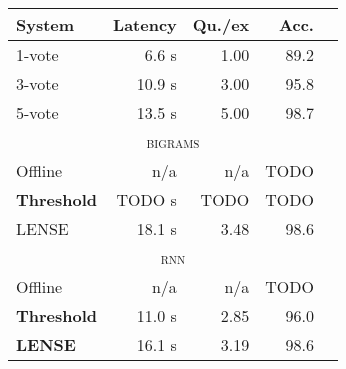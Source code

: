\begin{tabular}[b]{l  r  r  r  r}
    \textbf{System} & \textbf{Latency} & \textbf{Qu./ex} & \textbf{Acc.} \\ \hline
    1-vote & 6.6 s & 1.00 & 89.2 \\ %
    3-vote & 10.9 s & 3.00 & 95.8 \\ %
    5-vote & 13.5 s & 5.00 & 98.7 \\ %
    \multicolumn{5}{c}{\textsc{bigrams}} \\ \hline
    Offline & n/a & n/a & TODO \\ %
    \textbf{Threshold} & TODO s & TODO & TODO \\ %
    LENSE & 18.1 s & 3.48 & 98.6 \\ %
    \multicolumn{5}{c}{\textsc{rnn}} \\ \hline
    Offline & n/a & n/a & TODO \\ %
    \textbf{Threshold} & 11.0 s & 2.85 & 96.0 \\ %
    \textbf{LENSE} & 16.1 s & 3.19 & 98.6 \\%
\end{tabular}

